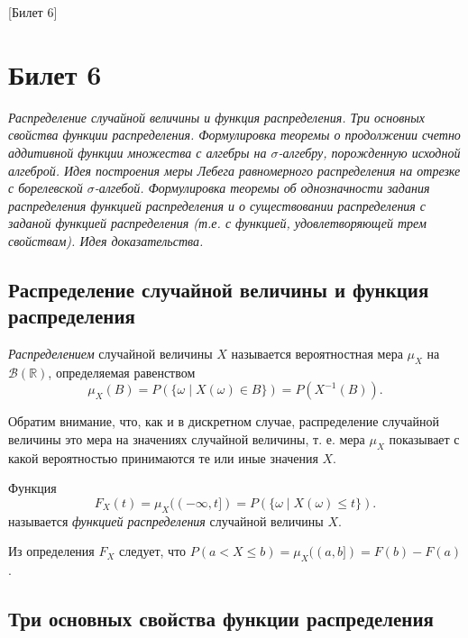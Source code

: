 [Билет 6]

\section{Билет 6}

\begin{center}
    \it Распределение случайной величины и функция распределения.
    Три основных свойства функции распределения.
    Формулировка теоремы о продолжении счетно аддитивной функции множества с алгебры на $\sigma$-алгебру, порожденную исходной алгеброй.
    Идея построения меры Лебега равномерного распределения на отрезке с борелевской $\sigma$-алгебой.
    Формулировка теоремы об однозначности задания распределения функцией распределения и о существовании распределения с заданой функцией распределения (т.е. с функцией, удовлетворяющей трем свойствам).
    Идея доказательства.
\end{center}

\sectionbreak
\subsection{Распределение случайной величины и функция распределения}

\begin{definition}
    {\it Распределением} случайной величины $X$ называется вероятностная мера $\mu_{X}$ на $\mathcal{B}(\mathbb{R})$, определяемая равенством
    \[
        \mu_{X}(B) = P(\{\omega \mid X(\omega) \in B\}) = P(X^{-1}(B)).
    \]
\end{definition}

Обратим внимание, что, как и в дискретном случае, распределение случайной величины это мера на значениях случайной величины, т. е. мера $\mu_{X}$ показывает с какой вероятностью принимаются те или иные значения $X$.

\begin{definition}
Функция
\[
    F_{X}(t) = \mu_{X}((-\infty, t]) = P(\{\omega \mid X(\omega) \leqslant t\}).
\]
называется {\it функцией распределения} случайной величины $X$.
\end{definition}

Из определения $F_X$ следует, что $P(a < X \leqslant b) = \mu_X((a,b]) = F(b) - F(a)$.

\sectionbreak
\subsection{Три основных свойства функции распределения}

